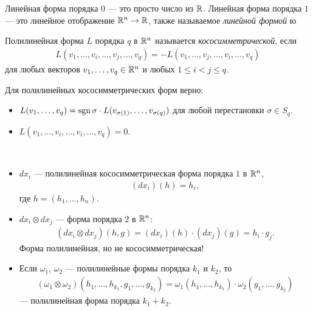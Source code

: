 \begin{exmpl*}
 Линейная форма порядка $0$ --- это просто число из $\mathbb{R}$. Линейная форма порядка $1$ --- это линейное отображение $\mathbb{R}^{n} \to \mathbb{R}$, также называемое \textit{линейной формой} ю
\end{exmpl*}
\begin{df}
 Полилинейная форма $L$ порядка $q$ в $\mathbb{R}^{n}$ называется \textit{кососимметрической}, если
 \begin{align*}
  L(v_1, \ldots, v_i, \ldots, v_j, \ldots, v_q) = -L(v_1, \ldots, v_j, \ldots, v_i, \ldots, v_q)
 \end{align*} для любых векторов $v_1, \ldots, v_q \in \mathbb{R}^{n}$ и любых $1 \leqslant i < j \leqslant q$.
\end{df}
\begin{prop*}
 Для полилинейных кососимметрических форм верно:
 \begin{itemize}
  \item $ L(v_1, \ldots, v_q) = \operatorname{sgn} \sigma \cdot L(v_{\sigma(1)}, \ldots, v_{\sigma(q)}) $ для любой перестановки $\sigma \in S_{q}$.
\item $L(v_1, \ldots, v_i, \ldots, v_i, \ldots, v_q) = 0$.
 \end{itemize}
\end{prop*}
\begin{exmpl}\
\begin{itemize}
 \item $dx_i$ --- полилинейная кососимметрическая форма порядка $1$ в $\mathbb{R}^{n}$,
  \begin{align*}
   ( dx_i )(h) = h_i
  ,\end{align*} где $h = (h_1, \ldots, h_n)$.
 \item $dx_i \otimes dx_j$ --- форма порядка $2$ в $\mathbb{R}^{n}$:
  \begin{align*}
   (dx_i \otimes dx_j)(h, g) = (dx_i)(h) \cdot (dx_j)(g) = h_i \cdot g_j
  .\end{align*} Форма полилинейная, но не кососимметрическая!
 \item Если $\omega_1$, $\omega_2$ --- полилинейные формы порядка $k_1$ и $k_2$, то
  \begin{align*}
   (\omega_1 \otimes \omega_2) (h_1, \ldots, h_{k_1}, g_1, \ldots, g_{k_2}) = \omega_1(h_1, \ldots, h_{k_1}) \cdot \omega_2(g_1, \ldots, g_{k_2})
  \end{align*}  --- полилинейная форма порядка $k_1 + k_2$.
\end{itemize} 
\end{exmpl}
